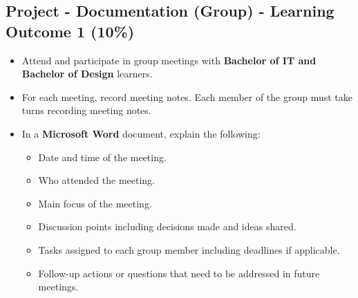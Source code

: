 \documentclass{article}
\begin{document}
\subsection*{Project - Documentation (Group) - Learning Outcome 1 (10\%)}
\begin{itemize}
	\item Attend and participate in group meetings with \textbf{Bachelor of IT and Bachelor of Design} learners.
	\item For each meeting, record meeting notes. Each member of the group must take turns recording meeting notes.
	\item In a \textbf{Microsoft Word} document, explain the following:
	\begin{itemize}
		\item Date and time of the meeting.
		\item Who attended the meeting.
		\item Main focus of the meeting.
		\item Discussion points including decisions made and ideas shared.
		\item Tasks assigned to each group member including deadlines if applicable.
		\item Follow-up actions or questions that need to be addressed in future meetings.
	\end{itemize}
\end{itemize}
\end{document}
